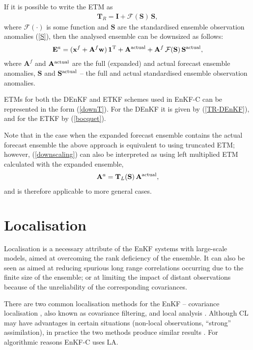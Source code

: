 \documentclass[11pt]{report}
\newcommand{\mb} {\mathbf}
\newcommand{\T}{^{\tiny \mathrm T}}
\newcommand*\suptxt[1]{^{\textnormal{#1}}}
\begin{document}
If it is possible to write the ETM as
\begin{align}
  \label{downT}
  \mb T_R = \mb I + \mathcal F(\mb S) \, \mb S,
\end{align}
where $\mathcal F(\cdot)$ is some function and $\mb S$ are the standardised ensemble observation anomalies (\ref{S}), then the analysed ensemble can be downsized as follows:
\begin{align}
  \label{downscaling}
  \mb E^{a} = (\mb x^f + \mb A^f \mb w) \, \mb 1\T + \mb A\suptxt{actual} + \mb A^f \, \mathcal F(\mb S) \, \mb S\suptxt{actual},
\end{align}
where $\mb A^f$ and $\mb A\suptxt{actual}$ are the full (expanded) and actual forecast ensemble anomalies, $\mb S$ and $\mb S\suptxt{actual}$ -- the full and actual standardised ensemble observation anomalies.

ETMs for both the DEnKF and ETKF schemes used in EnKF-C can be represented in the form (\ref{downT}).
For the DEnKF it is given by (\ref{TR-DEnKF}), and for the ETKF by (\ref{bocquet}).

Note that in the case when the expanded forecast ensemble contains the actual forecast ensemble the above approach is equivalent to using truncated ETM; however, (\ref{downscaling}) can also be interpreted as using left multiplied ETM calculated with the expanded ensemble,
\begin{align*}
  \mb A^a = \mb T_L(\mb S) \, \mb A\suptxt{actual},
\end{align*}
and is therefore applicable to more general cases.

\section{Localisation}

Localisation is a necessary attribute of the EnKF systems with large-scale models, aimed at overcoming the rank deficiency of the ensemble.
It can also be seen as aimed at reducing spurious long range correlations occurring due to the finite size of the ensemble; or at limiting the impact of distant observations because of the unreliability of the corresponding covariances.

There are two common localisation methods for the EnKF -- covariance localisation \citep[CL,][]{ham01b, hou01a}, also known as covariance filtering, and local analysis \citep[LA,][]{hou98a, eve03a, ott03a}.
Although CL may have advantages in certain situations (non-local observations, ``strong'' assimilation), in practice the two methods produce similar results \citep{sak11a}.
For algorithmic reasons EnKF-C uses LA.
\end{document}
